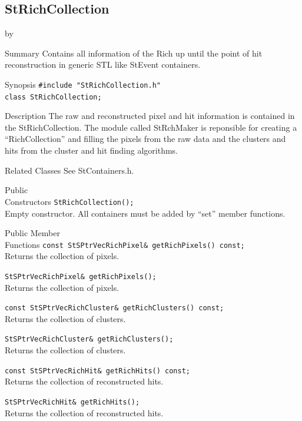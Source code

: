 \documentclass[twoside]{article}
\newcommand{\entrylabel}[1]{\mbox{\textbf{{#1}}}\hfil}%
\newenvironment{entry}
{\begin{list}{}%
    {\renewcommand{\makelabel}{\entrylabel}%
     \setlength{\labelwidth}{90pt}%
     \setlength{\leftmargin}{\labelwidth}
     \advance\leftmargin by \labelsep%
      }%
    }%
  {\end{list}}
\newcommand{\Entrylabel}[1]%
{\raisebox{0pt}[1ex][0pt]{\makebox[\labelwidth][l]%
    {\parbox[t]{\labelwidth}{\hspace{0pt}\textbf{{#1}}}}}}
\newenvironment{Entry}%
{\renewcommand{\entrylabel}{\Entrylabel}\begin{entry}}%
  {\end{entry}}
\begin{document}
\subsection{StRichCollection}
\label{sec:StRichCollection}
\begin{Entry}
\item[Summary] Contains all information of the Rich
    up until the point of hit reconstruction in generic
    STL like StEvent containers.
\item[Synopsis]
    \verb+#include "StRichCollection.h"+\\
    \verb+class StRichCollection;+\\
\item[Description] The raw and reconstructed pixel and
    hit information is contained in the StRichCollection.
    The module called StRchMaker is reponsible for 
    creating a ``RichCollection'' and filling the pixels
    from the raw data and the clusters and hits from
    the cluster and hit finding algorithms.
\item[Related Classes]
    See StContainers.h.
\item[Public\\ Constructors]
    \verb+StRichCollection();+\\
    Empty constructor.  All containers must be added by
    ``set'' member functions.
\item[Public Member\\ Functions]
    \verb+const StSPtrVecRichPixel& getRichPixels() const;+\\
    Returns the collection of pixels.

    \verb+StSPtrVecRichPixel& getRichPixels();+\\
    Returns the collection of pixels.

    \verb+const StSPtrVecRichCluster& getRichClusters() const;+\\
    Returns the collection of clusters.

    \verb+StSPtrVecRichCluster& getRichClusters();+\\
    Returns the collection of clusters.

    \verb+const StSPtrVecRichHit& getRichHits() const;+\\
    Returns the collection of reconstructed hits.

    \verb+StSPtrVecRichHit& getRichHits();+\\
    Returns the collection of reconstructed hits.


\end{Entry}
\end{document}
